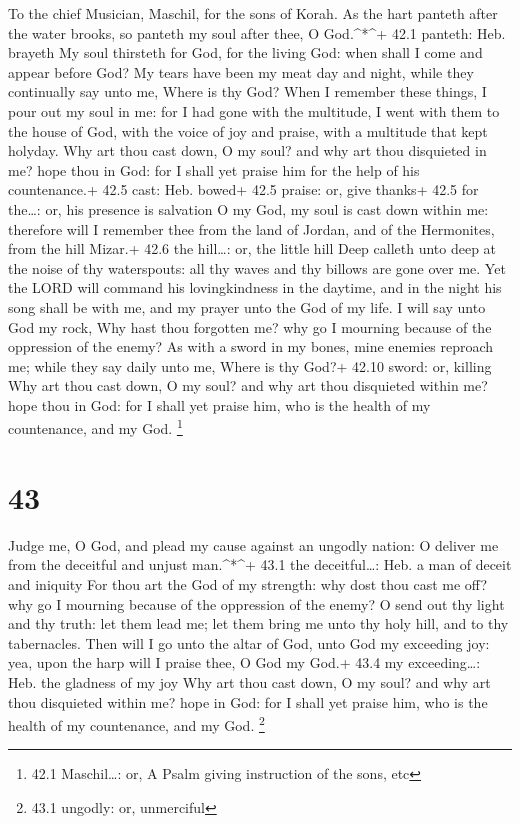 To the chief Musician, Maschil, for the sons of Korah.  As
the hart panteth after the water brooks, so panteth my soul after thee,
O God.\^{}*\^{}+ 42.1 panteth: Heb. brayeth  My soul
thirsteth for God, for the living God: when shall I come and appear
before God?  My tears have been my meat day and night, while
they continually say unto me, Where is thy God?  When I
remember these things, I pour out my soul in me: for I had gone with the
multitude, I went with them to the house of God, with the voice of joy
and praise, with a multitude that kept holyday.  Why art
thou cast down, O my soul? and why art thou disquieted in me? hope thou
in God: for I shall yet praise him for the help of his countenance.+
42.5 cast: Heb. bowed+ 42.5 praise: or, give thanks+ 42.5 for the\ldots:
or, his presence is salvation  O my God, my soul is cast
down within me: therefore will I remember thee from the land of Jordan,
and of the Hermonites, from the hill Mizar.+ 42.6 the hill\ldots: or,
the little hill  Deep calleth unto deep at the noise of thy
waterspouts: all thy waves and thy billows are gone over me.
 Yet the LORD will command his lovingkindness in the
daytime, and in the night his song shall be with me, and my prayer unto
the God of my life.  I will say unto God my rock, Why hast
thou forgotten me? why go I mourning because of the oppression of the
enemy?  As with a sword in my bones, mine enemies reproach
me; while they say daily unto me, Where is thy God?+ 42.10 sword: or,
killing  Why art thou cast down, O my soul? and why art
thou disquieted within me? hope thou in God: for I shall yet praise him,
who is the health of my countenance, and my God. \footnote{42.1
  Maschil\ldots: or, A Psalm giving instruction of the sons, etc}

\hypertarget{section-42}{%
\section{43}\label{section-42}}

 Judge me, O God, and plead my cause against an ungodly
nation: O deliver me from the deceitful and unjust man.\^{}*\^{}+ 43.1
the deceitful\ldots: Heb. a man of deceit and iniquity  For
thou art the God of my strength: why dost thou cast me off? why go I
mourning because of the oppression of the enemy?  O send out
thy light and thy truth: let them lead me; let them bring me unto thy
holy hill, and to thy tabernacles.  Then will I go unto the
altar of God, unto God my exceeding joy: yea, upon the harp will I
praise thee, O God my God.+ 43.4 my exceeding\ldots: Heb. the gladness
of my joy  Why art thou cast down, O my soul? and why art
thou disquieted within me? hope in God: for I shall yet praise him, who
is the health of my countenance, and my God. \footnote{43.1 ungodly: or,
  unmerciful}

